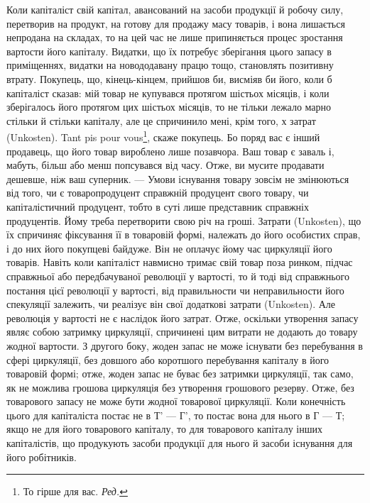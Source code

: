 Коли капіталіст свій капітал, авансований на засоби продукції й робочу
силу, перетворив на продукт, на готову для продажу масу товарів, і вона
лишається непродана на складах, то на цей час не лише припиняється
процес зростання вартости його капіталу. Видатки, що їх потребує зберігання
цього запасу в приміщеннях, видатки на новододавану працю тощо, становлять
позитивну втрату. Покупець, що, кінець-кінцем, прийшов би, висміяв
би його, коли б капіталіст сказав: мій товар не купувався протягом шістьох
місяців, і коли зберігалось його протягом цих шістьох місяців, то не
тільки лежало марно стільки й стільки капіталу, але це спричинило мені,
крім того, х затрат (Unkosten). Tant pis pour vous\footnote*{
То гірше для вас. \emph{Ред.}
}, скаже покупець. Бо
поряд вас є інший продавець, що його товар вироблено лише позавчора.
Ваш товар є заваль і, мабуть, більш або менш попсувався від часу. Отже,
ви мусите продавати дешевше, ніж ваш суперник. — Умови існування
товару зовсім не змінюються від того, чи є товаропродуцент справжній
продуцент свого товару, чи капіталістичний продуцент, тобто в суті
лише представник справжніх продуцентів. Йому треба перетворити свою
річ на гроші. Затрати (Unkosten), що їх спричиняє фіксування її
в товаровій формі, належать до його особистих справ, і до них його
покупцеві байдуже. Він не оплачує йому час циркуляції його товарів.
Навіть коли капіталіст навмисно тримає свій товар поза ринком, підчас
справжньої або передбачуваної революції у вартості, то й тоді від
справжнього постання цієї революції у вартості, від правильности чи
неправильности його спекуляції залежить, чи реалізує він свої додаткові
затрати (Unkosten). Але революція у вартості не є наслідок його затрат.
Отже, оскільки утворення запасу являє собою затримку циркуляції, спричинені
цим витрати не додають до товару жодної вартости. З другого
боку, жоден запас не може існувати без перебування в сфері циркуляції,
без довшого або коротшого перебування капіталу в його товаровій
формі; отже, жоден запас не буває без затримки циркуляції, так само,
як не можлива грошова циркуляція без утворення грошового резерву.
Отже, без товарового запасу не може бути жодної товарової циркуляції.
Коли конечність цього для капіталіста постає не в Т' — Г', то постає
вона для нього в Г — Т; якщо не для його товарового капіталу, то
для товарового капіталу інших капіталістів, що продукують засоби продукції
для нього й засоби існування для його робітників.

